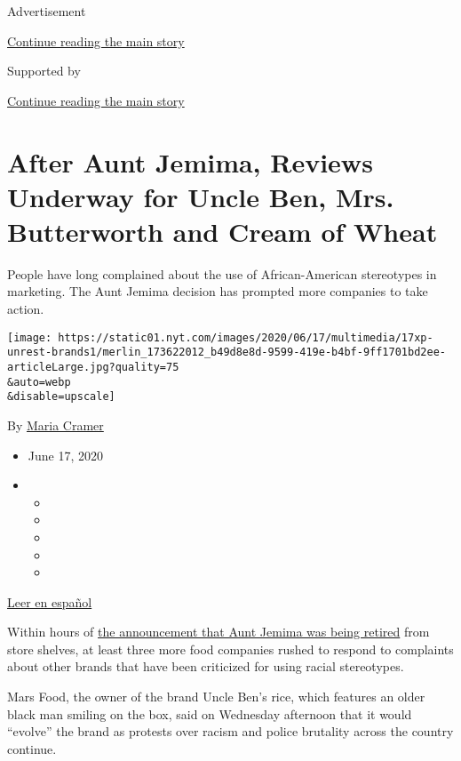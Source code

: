 Advertisement

\protect\hyperlink{after-top}{Continue reading the main story}

Supported by

\protect\hyperlink{after-sponsor}{Continue reading the main story}

\hypertarget{after-aunt-jemima-reviews-underway-for-uncle-ben-mrs-butterworth-and-cream-of-wheat}{%
\section{After Aunt Jemima, Reviews Underway for Uncle Ben, Mrs.
Butterworth and Cream of
Wheat}\label{after-aunt-jemima-reviews-underway-for-uncle-ben-mrs-butterworth-and-cream-of-wheat}}

People have long complained about the use of African-American
stereotypes in marketing. The Aunt Jemima decision has prompted more
companies to take action.

\texttt{[image: https://static01.nyt.com/images/2020/06/17/multimedia/17xp-unrest-brands1/merlin\_173622012\_b49d8e8d-9599-419e-b4bf-9ff1701bd2ee-articleLarge.jpg?quality=75\\\&auto=webp\\\&disable=upscale]}

By \href{https://www.nytimes.com/by/maria-cramer}{Maria Cramer}

\begin{itemize}
\item
  June 17, 2020
\item
  \begin{itemize}
  \item
  \item
  \item
  \item
  \item
  \end{itemize}
\end{itemize}

\href{https://www.nytimes.com/es/2020/06/18/espanol/negocios/aunt-jemima-racismo-estereotipos.html}{Leer
en español}

Within hours of
\href{https://www.nytimes.com/2020/06/17/business/aunt-jemima-racial-stereotype.html}{the
announcement that Aunt Jemima was being retired} from store shelves, at
least three more food companies rushed to respond to complaints about
other brands that have been criticized for using racial stereotypes.

Mars Food, the owner of the brand Uncle Ben's rice, which features an
older black man smiling on the box, said on Wednesday afternoon that it
would ``evolve'' the brand as protests over racism and police brutality
across the country continue.

